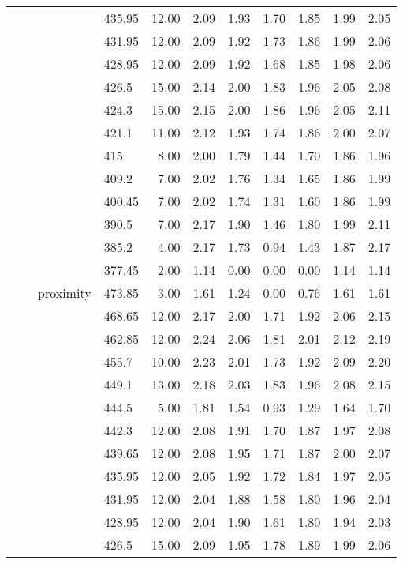\begin{longtable}{llllrrrrrrr}
   &  &  & 435.95 & 12.00 & 2.09 & 1.93 & 1.70 & 1.85 & 1.99 & 2.05 \\ 
   &  &  & 431.95 & 12.00 & 2.09 & 1.92 & 1.73 & 1.86 & 1.99 & 2.06 \\ 
   &  &  & 428.95 & 12.00 & 2.09 & 1.92 & 1.68 & 1.85 & 1.98 & 2.06 \\ 
   &  &  & 426.5 & 15.00 & 2.14 & 2.00 & 1.83 & 1.96 & 2.05 & 2.08 \\ 
   &  &  & 424.3 & 15.00 & 2.15 & 2.00 & 1.86 & 1.96 & 2.05 & 2.11 \\ 
   &  &  & 421.1 & 11.00 & 2.12 & 1.93 & 1.74 & 1.86 & 2.00 & 2.07 \\ 
   &  &  & 415 & 8.00 & 2.00 & 1.79 & 1.44 & 1.70 & 1.86 & 1.96 \\ 
   &  &  & 409.2 & 7.00 & 2.02 & 1.76 & 1.34 & 1.65 & 1.86 & 1.99 \\ 
   &  &  & 400.45 & 7.00 & 2.02 & 1.74 & 1.31 & 1.60 & 1.86 & 1.99 \\ 
   &  &  & 390.5 & 7.00 & 2.17 & 1.90 & 1.46 & 1.80 & 1.99 & 2.11 \\ 
   &  &  & 385.2 & 4.00 & 2.17 & 1.73 & 0.94 & 1.43 & 1.87 & 2.17 \\ 
   &  &  & 377.45 & 2.00 & 1.14 & 0.00 & 0.00 & 0.00 & 1.14 & 1.14 \\ 
   &  & proximity & 473.85 & 3.00 & 1.61 & 1.24 & 0.00 & 0.76 & 1.61 & 1.61 \\ 
   &  &  & 468.65 & 12.00 & 2.17 & 2.00 & 1.71 & 1.92 & 2.06 & 2.15 \\ 
   &  &  & 462.85 & 12.00 & 2.24 & 2.06 & 1.81 & 2.01 & 2.12 & 2.19 \\ 
   &  &  & 455.7 & 10.00 & 2.23 & 2.01 & 1.73 & 1.92 & 2.09 & 2.20 \\ 
   &  &  & 449.1 & 13.00 & 2.18 & 2.03 & 1.83 & 1.96 & 2.08 & 2.15 \\ 
   &  &  & 444.5 & 5.00 & 1.81 & 1.54 & 0.93 & 1.29 & 1.64 & 1.70 \\ 
   &  &  & 442.3 & 12.00 & 2.08 & 1.91 & 1.70 & 1.87 & 1.97 & 2.08 \\ 
   &  &  & 439.65 & 12.00 & 2.08 & 1.95 & 1.71 & 1.87 & 2.00 & 2.07 \\ 
   &  &  & 435.95 & 12.00 & 2.05 & 1.92 & 1.72 & 1.84 & 1.97 & 2.05 \\ 
   &  &  & 431.95 & 12.00 & 2.04 & 1.88 & 1.58 & 1.80 & 1.96 & 2.04 \\ 
   &  &  & 428.95 & 12.00 & 2.04 & 1.90 & 1.61 & 1.80 & 1.94 & 2.03 \\ 
   &  &  & 426.5 & 15.00 & 2.09 & 1.95 & 1.78 & 1.89 & 1.99 & 2.06 \\ 

\end{longtable}
